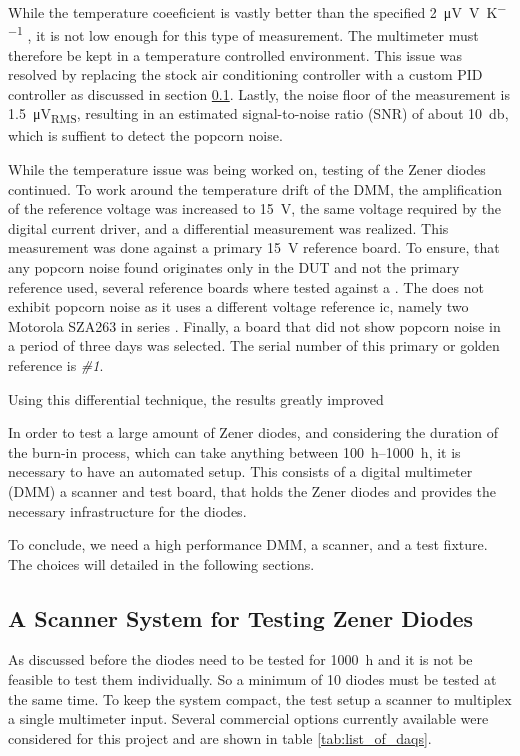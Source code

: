 While the temperature coeeficient is vastly better than the specified \qty[per-mode=symbol]{2}{\micro\volt \per \volt \per \kelvin} \cite{datasheet_keysight34470A}, it is not low enough for this type of measurement. The multimeter must therefore be kept in a temperature controlled environment. This issue was resolved by replacing the stock air conditioning controller with a custom PID controller as discussed in section \ref{}. Lastly, the noise floor of the measurement is \qty{1.5}{\micro\volt_{RMS}}, resulting in an estimated signal-to-noise ratio (SNR) of about \qty{10}{\decibel}, which is suffient to detect the popcorn noise.

While the temperature issue was being worked on, testing of the Zener diodes continued. To work around the temperature drift of the DMM, the amplification of the reference voltage was increased to \qty{15}{\volt}, the same voltage required by the digital current driver, and a differential measurement was realized. This measurement was done against a primary \qty{15}{\volt} reference board. To ensure, that any popcorn noise found originates only in the DUT and not the primary reference used, several reference boards where tested against a . The  does not exhibit popcorn noise as it uses a different voltage reference ic, namely two Motorola SZA263 in series \cite{service_manual_fluke_5440b}. Finally, a board that did not show popcorn noise in a period of three days was selected. The serial number of this primary or golden reference is \textit{\#1}.

Using this differential technique, the results greatly improved

In order to test a large amount of Zener diodes, and considering the duration of the burn-in process, which can take anything between \qtyrange{100}{1000}{\hour}, it is necessary to have an automated setup. This consists of a digital multimeter (DMM) a scanner and test board, that holds the Zener diodes and provides the necessary infrastructure for the diodes.



To conclude, we need a high performance DMM, a scanner, and a test fixture. The choices will detailed in the following sections.



\subsection{A Scanner System for Testing Zener Diodes}
As discussed before the diodes need to be tested for \qty{1000}{\hour} and it is not be feasible to test them individually. So a minimum of 10 diodes must be tested at the same time. To keep the system compact, the test setup a scanner to multiplex a single multimeter input. Several commercial options currently available were considered for this project and are shown in table \ref{tab:list_of_daqs}.

